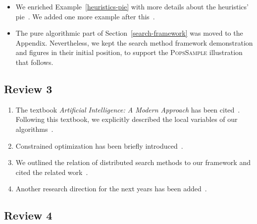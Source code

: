 \documentclass{ws-ijait}
\begin{document}
\begin{itemize}
  \item We enriched Example~\ref{heuristics-pie} with more
        details about the heuristics' pie~. We
        added one more example after this~.
  \item The pure algorithmic part of
        Section~\ref{search-framework} was moved to the
        Appendix. Nevertheless, we kept the search method
        framework demonstration and figures in their initial
        position, to support the \textsc{PopsSample}
        illustration that follows.
\end{itemize}

\subsection*{Review 3}

\begin{enumerate}
  \item The textbook \emph{Artificial Intelligence: A Modern
        Approach} has been cited~. Following
        this textbook, we explicitly described the local
        variables of our algorithms~.
  \item Constrained optimization has been briefly
        introduced~.
  \item We outlined the relation of distributed search
        methods to our framework and cited the related
        work~.
  \item Another research direction for the next years has
        been added~.
\end{enumerate}

\subsection*{Review 4}
\end{document}

